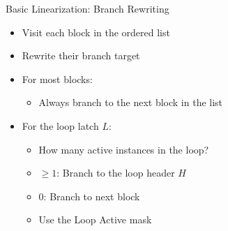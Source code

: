 
\begin{frame}{Basic Linearization: Branch Rewriting}

\begin{minipage}[t]{0.55\linewidth}

\begin{itemize}
    \item Visit each block in the ordered list
    \item Rewrite their branch target
\end{itemize}

\begin{itemize}
    \item For most blocks:
    \begin{itemize}
        \item Always branch to the next block in the list
    \end{itemize}
    \item For the loop latch $L$:
    \begin{itemize}
        \item How many active instances in the loop?
        \item $\geq 1$: Branch to the loop header $H$
        \item $0$: Branch to next block
        \item Use the Loop Active mask
    \end{itemize}
\end{itemize}

\end{minipage}
\begin{minipage}[t]{0.42\linewidth}

\vspace{0.1ex}


\end{minipage}

\end{frame}

